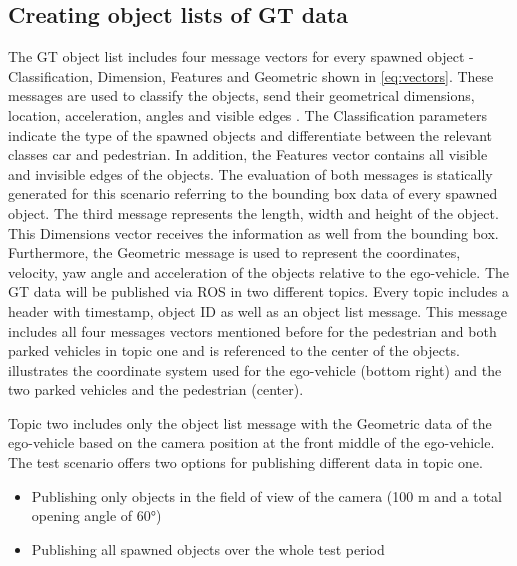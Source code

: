 \subsection{Creating object lists of \ac{GT} data}\label{B}
The \ac{GT} object list includes four message vectors for every spawned object - Classification, Dimension, Features and Geometric shown in \cref{eq:vectors}. These messages are used to classify the objects, send their geometrical dimensions, location, acceleration, angles and visible edges \cite{Aeberhard}.
The Classification parameters indicate the type of the spawned objects and differentiate between the relevant classes car and pedestrian. In addition, the Features vector contains all visible and invisible edges of the objects. The evaluation of both messages is statically generated for this scenario referring to the bounding box data of every spawned object. The third message represents the length, width and height of the object. This Dimensions vector receives the information as well from the bounding box. Furthermore, the Geometric message is used to represent the coordinates, velocity, yaw angle and acceleration of the objects relative to the ego-vehicle. 
The \ac{GT} data will be published via \ac{ROS} in two different topics. Every topic includes a header with timestamp, object \ac{ID} as well as an object list message. This message includes all four messages vectors mentioned before for the pedestrian and both parked vehicles in topic one and is referenced to the center of the objects.  illustrates the coordinate system used for the ego-vehicle (bottom right) and the two parked vehicles and the pedestrian (center). 

Topic two includes only the object list message with the Geometric data of the ego-vehicle based on the camera position at the front middle of the ego-vehicle.
The test scenario offers two options for publishing different data in topic one.
\begin{itemize}
	\item Publishing only objects in the field of view of the camera (100 m and a total opening angle of \ang{60})
	\item Publishing all spawned objects over the whole test period
\end{itemize}